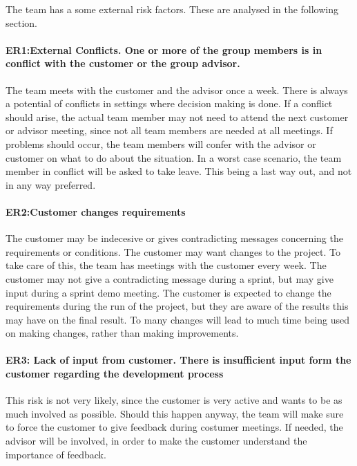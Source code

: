 The team has a some external risk factors. These are analysed in the following section. \\

\paragraph{ER1:External Conflicts. One or more of the group members is in conflict with the customer or the group advisor.}
The team meets with the customer and the advisor once a week. There is always a potential 
of conflicts in settings where decision making is done. If a conflict should arise, the 
actual team member may not need to attend the next customer or advisor meeting, since not 
all team members are needed at all meetings. If problems should occur, the team members will 
confer with the advisor or customer on what to do about the situation. In a worst case scenario, 
the team member in conflict will be asked to take leave. This being a last way out, and not in any way preferred. 

\paragraph{ER2:Customer changes requirements}
The customer may be indecesive or gives contradicting messages concerning the requirements or 
conditions. The customer may want changes to the project. To take care of this, the team has 
meetings with the customer every week. The customer may not give a contradicting message during 
a sprint, but may give input during a sprint demo meeting. The customer is expected to change the 
requirements during the run of the project, but they are aware of the results this may have on the 
final result. To many changes will lead to much time being used on making changes, rather than 
making improvements. 

\paragraph{ER3: Lack of input from customer. There is insufficient input form the customer regarding the development process}
This risk is not very likely, since the customer is very active and wants to be as much 
involved as possible. Should this happen anyway, the team will make sure to force the customer 
to give feedback during costumer meetings. If needed, the advisor will be involved, in order to 
make the customer understand the importance of feedback.


